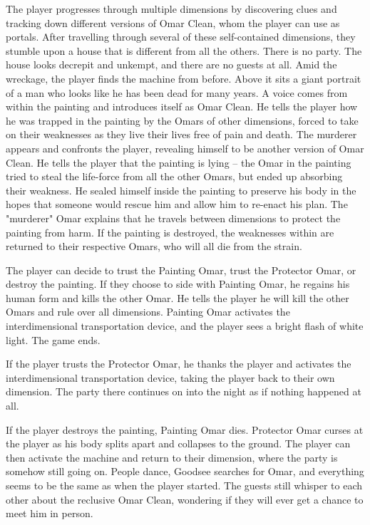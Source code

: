 The player progresses through multiple dimensions by discovering clues and tracking down different versions of Omar Clean, whom the player can use as portals. After travelling through several of these self-contained dimensions, they stumble upon a house that is different from all the others. There is no party. The house looks decrepit and unkempt, and there are no guests at all. Amid the wreckage, the player finds the machine from before. Above it sits a giant portrait of a man who looks like he has been dead for many years. A voice comes from within the painting and introduces itself as Omar Clean. He tells the player how he was trapped in the painting by the Omars of other dimensions, forced to take on their weaknesses as they live their lives free of pain and death. The murderer appears and confronts the player, revealing himself to be another version of Omar Clean. He tells the player that the painting is lying -- the Omar in the painting tried to steal the life-force from all the other Omars, but ended up absorbing their weakness. He sealed himself inside the painting to preserve his body in the hopes that someone would rescue him and allow him to re-enact his plan. The "murderer" Omar explains that he travels between dimensions to protect the painting from harm. If the painting is destroyed, the weaknesses within are returned to their respective Omars, who will all die from the strain.

The player can decide to trust the Painting Omar, trust the Protector Omar, or destroy the painting. If they choose to side with Painting Omar, he regains his human form and kills the other Omar. He tells the player he will kill the other Omars and rule over all dimensions. Painting Omar activates the interdimensional transportation device, and the player sees a bright flash of white light. The game ends.

If the player trusts the Protector Omar, he thanks the player and activates the interdimensional transportation device, taking the player back to their own dimension. The party there continues on into the night as if nothing happened at all.

If the player destroys the painting, Painting Omar dies. Protector Omar curses at the player as his body splits apart and collapses to the ground. The player can then activate the machine and return to their dimension, where the party is somehow still going on. People dance, Goodsee searches for Omar, and everything seems to be the same as when the player started. The guests still whisper to each other about the reclusive Omar Clean, wondering if they will ever get a chance to meet him in person.